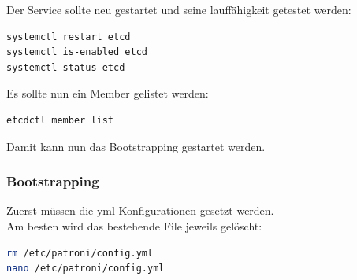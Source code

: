 Der Service sollte neu gestartet und seine lauffähigkeit getestet werden:
\lstset{style=gra_codestyle}
\begin{lstlisting}[language=bash, caption=etcd - restart,captionpos=b,label={lst:etcd_restart},breaklines=true]
systemctl restart etcd
systemctl is-enabled etcd
systemctl status etcd
\end{lstlisting}

Es sollte nun ein Member gelistet werden:
\lstset{style=gra_codestyle}
\begin{lstlisting}[language=bash, caption=etcd - member list,captionpos=b,label={lst:etcd_member_list},breaklines=true]
etcdctl member list
\end{lstlisting}

Damit kann nun das Bootstrapping gestartet werden.

\subsubsection{Bootstrapping}
Zuerst müssen die yml-Konfigurationen gesetzt werden.\\
Am besten wird das bestehende File jeweils gelöscht:
\lstset{style=gra_codestyle}
\begin{lstlisting}[language=bash, caption=Patroni Bootstrap - Konfiguration bereinigen,captionpos=b,label={lst:patroni-bootstrap-cleanup-yml},breaklines=true]
rm /etc/patroni/config.yml
nano /etc/patroni/config.yml
\end{lstlisting}

